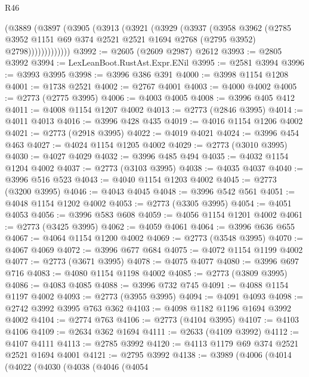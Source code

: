 \begin{lexlean}{R46}
\begin{coremodule}
            (@3889
              (@3897
                (@3905
                  (@3913
                    (@3921
                      (@3929
                        (@3937
                          (@3958
                            @3962
                            (@2785
                              @3952
                              @1151
                              @69
                              @374
                              @2521
                              @2521
                              @1694
                              @2768
                              (@2795 @3952)
                              @2798)))))))))))))
@3992 := @2605 (@2609 @2987) @2612
@3993 := @2805 @3992
@3994 := LexLeanBoot.RustAst.Expr.ENil
@3995 := @2581 @3994
@3996 := @3993 @3995
@3998 := @3996 @386 @391
@4000 := @3998 @1154 @1208
@4001 := @1738 @2521
@4002 := @2767 @4001
@4003 := @4000 @4002
@4005 := @2773 (@2775 @3995)
@4006 := @4003 @4005
@4008 := @3996 @405 @412
@4011 := @4008 @1154 @1207 @4002
@4013 := @2773 (@2846 @3995)
@4014 := @4011 @4013
@4016 := @3996 @428 @435
@4019 := @4016 @1154 @1206 @4002
@4021 := @2773 (@2918 @3995)
@4022 := @4019 @4021
@4024 := @3996 @454 @463
@4027 := @4024 @1154 @1205 @4002
@4029 := @2773 (@3010 @3995)
@4030 := @4027 @4029
@4032 := @3996 @485 @494
@4035 := @4032 @1154 @1204 @4002
@4037 := @2773 (@3103 @3995)
@4038 := @4035 @4037
@4040 := @3996 @516 @523
@4043 := @4040 @1154 @1203 @4002
@4045 := @2773 (@3200 @3995)
@4046 := @4043 @4045
@4048 := @3996 @542 @561
@4051 := @4048 @1154 @1202 @4002
@4053 := @2773 (@3305 @3995)
@4054 := @4051 @4053
@4056 := @3996 @583 @608
@4059 := @4056 @1154 @1201 @4002
@4061 := @2773 (@3425 @3995)
@4062 := @4059 @4061
@4064 := @3996 @636 @655
@4067 := @4064 @1154 @1200 @4002
@4069 := @2773 (@3548 @3995)
@4070 := @4067 @4069
@4072 := @3996 @677 @684
@4075 := @4072 @1154 @1199 @4002
@4077 := @2773 (@3671 @3995)
@4078 := @4075 @4077
@4080 := @3996 @697 @716
@4083 := @4080 @1154 @1198 @4002
@4085 := @2773 (@3809 @3995)
@4086 := @4083 @4085
@4088 := @3996 @732 @745
@4091 := @4088 @1154 @1197 @4002
@4093 := @2773 (@3955 @3995)
@4094 := @4091 @4093
@4098 := @2742 @3992 @3995 @763 @362
@4103 := @4098 @1182 @1196 @1694 @3992 @4002
@4104 := @2774 @763
@4106 := @2773 (@4104 @3995)
@4107 := @4103 @4106
@4109 := @2634 @362 @1694
@4111 := @2633 (@4109 @3992)
@4112 := @4107 @4111
@4113 := @2785 @3992
@4120 := @4113 @1179 @69 @374 @2521 @2521 @1694 @4001
@4121 := @2795 @3992
@4138 := @3989
    (@4006
      (@4014
        (@4022
          (@4030
            (@4038
              (@4046
                (@4054

\end{coremodule}
\end{lexlean}
